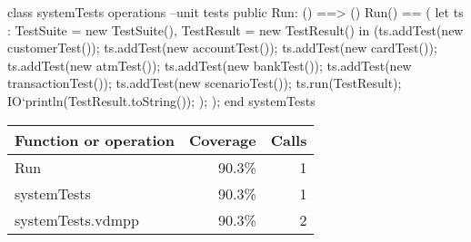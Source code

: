\documentclass[a4paper]{article}
\begin{document}
\title{}
\author{}
\begin{vdm_al}

class systemTests
 operations
    --unit tests
    public Run: () ==> ()
    Run() == (
        let ts : TestSuite = new TestSuite(),
        TestResult = new TestResult()
        in (ts.addTest(new customerTest());
            ts.addTest(new accountTest());
            ts.addTest(new cardTest());
            ts.addTest(new atmTest());
            ts.addTest(new bankTest());
            ts.addTest(new transactionTest());
            ts.addTest(new scenarioTest());
            ts.run(TestResult);
            IO`println(TestResult.toString());
        );
    );
end systemTests
\end{vdm_al}
\bigskip
\begin{longtable}{|l|r|r|}
\hline
Function or operation & Coverage & Calls \\
\hline
\hline
Run & 90.3\% & 1 \\
\hline
systemTests & 90.3\% & 1 \\
\hline
\hline
systemTests.vdmpp & 90.3\% & 2 \\
\hline
\end{longtable}
\end{document}
